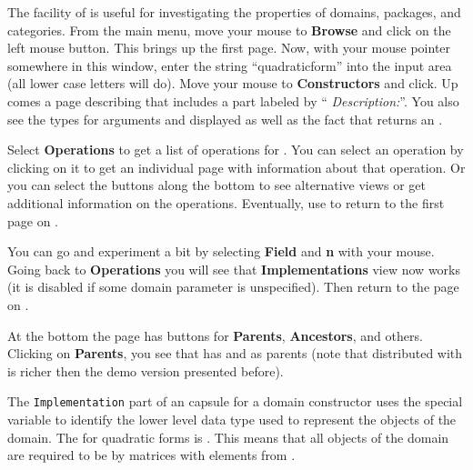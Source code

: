 {{{{%

The \Browse{} facility of \HyperName{} is useful for
investigating
the properties of domains, packages, and categories.
From the main \HyperName{} menu, move your mouse to {\bf Browse} and
click on the left mouse button.
This brings up the \Browse{} first page.
Now, with your mouse pointer somewhere in this window, enter the
string ``quadraticform'' into the input area (all lower case
letters will do).
Move your mouse to {\bf Constructors} and click.
Up comes a page describing 
that includes a part labeled by ``{\it
Description:}''.
You also see the types for arguments  and 
displayed as well as the fact that 
returns an .

Select {\bf Operations} to get a list of operations for
.
You can select an operation by clicking on it
to get an individual page with information about that operation.
Or you can select the buttons along the bottom to see alternative
views or get additional information on the operations.
Eventually, use
\UpButton{}
to return to the first page on
.

You can go and experiment a bit by selecting {\bf Field} and {\bf n}
with your mouse.  Going back to {\bf Operations} you will see
that {\bf Implementations} view now works (it is disabled if
some domain parameter is unspecified).
Then return to the page on .

At the bottom the  page has buttons
for {\bf Parents}, {\bf Ancestors}, and others.
Clicking on {\bf Parents}, you see that 
has  and  as
parents (note that  distributed
with \Language{} is richer then the demo version presented
before).

%
The {\tt Implementation} part of an \Language{} capsule for a
domain constructor uses the special variable  to
identify the lower level data type used to represent the objects
of the domain.
The  for quadratic forms is .
This means that all objects of the domain are required to be
 by  matrices with elements from .

}}}}
